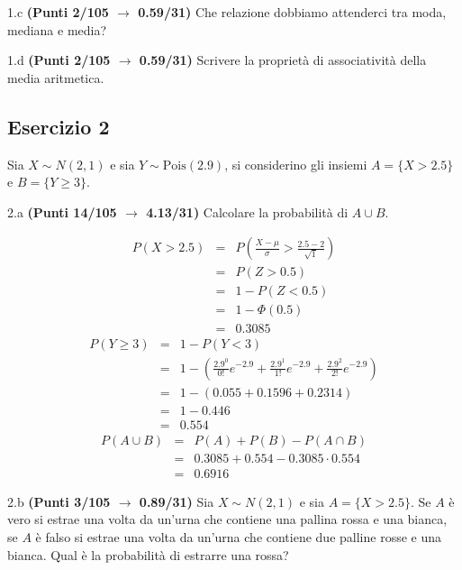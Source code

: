 \documentclass[
  11pt,
]{book}
\theoremstyle{mytheoremstyle}
\theoremstyle{mydefstyle}
\newenvironment{sol}
  {
  \begin{tcolorbox}[enhanced,breakable,arc=0.1mm,boxrule=1pt,colback=white,colframe=iblue,
  title=\bf \fontfamily{lmss}\selectfont \hspace{.5 cm} Soluzione,drop fuzzy shadow]

}{
\end{tcolorbox}
  }
\begin{document}
1.c \textbf{(Punti 2/105 \(\rightarrow\) 0.59/31)} Che relazione dobbiamo attenderci tra moda, mediana e media?

1.d \textbf{(Punti 2/105 \(\rightarrow\) 0.59/31)} Scrivere la proprietà di associatività della media aritmetica.

\subsection{Esercizio 2}\label{esercizio-2-31}

Sia \(X\sim N(2,1)\) e sia \(Y\sim\text{Pois}(2.9)\), si considerino gli insiemi
\(A=\{X>2.5\}\) e \(B=\{Y\geq 3\}\).

2.a \textbf{(Punti 14/105 \(\rightarrow\) 4.13/31)} Calcolare la probabilità di \(A\cup B\).

\begin{sol}
\begin{eqnarray*}
      P( X   >   2.5 ) 
        &=& P\left(  \frac { X  -  \mu }{ \sigma }  >  \frac { 2.5  -  2 }{\sqrt{ 1 }} \right)  \\
                 &=& P\left(  Z   >   0.5 \right) \\    &=& 1-P(Z< 0.5 )\\ 
                 &=&  1-\Phi( 0.5 ) \\ &=&  0.3085 
      \end{eqnarray*}\begin{eqnarray*}
   P( Y \geq 3 ) &=& 1-P( Y < 3 ) \\                 &=& 1-\left( \frac{ 2.9 ^{ 0 }}{ 0 !}e^{- 2.9 }+\frac{ 2.9 ^{ 1 }}{ 1 !}e^{- 2.9 }+\frac{ 2.9 ^{ 2 }}{ 2 !}e^{- 2.9 } \right)\\                 &=& 1-( 0.055+0.1596+0.2314 )\\                 &=& 1- 0.446 \\                 &=&   0.554 
\end{eqnarray*}
\begin{eqnarray*}
  P(A\cup B) &=&  P(A)+P(B)-P(A\cap B)\\
  &=& 0.3085+0.554-0.3085\cdot0.554\\
  &=& 0.6916
\end{eqnarray*}

\end{sol}

2.b \textbf{(Punti 3/105 \(\rightarrow\) 0.89/31)} Sia \(X\sim N(2,1)\) e sia \(A=\{X>2.5\}\).
Se \(A\) è vero si estrae una volta da un'urna che contiene una pallina rossa e una bianca,
se \(A\) è falso si estrae una volta da un'urna che contiene due palline rosse e una bianca.
Qual è la probabilità di estrarre una rossa?
\end{document}
